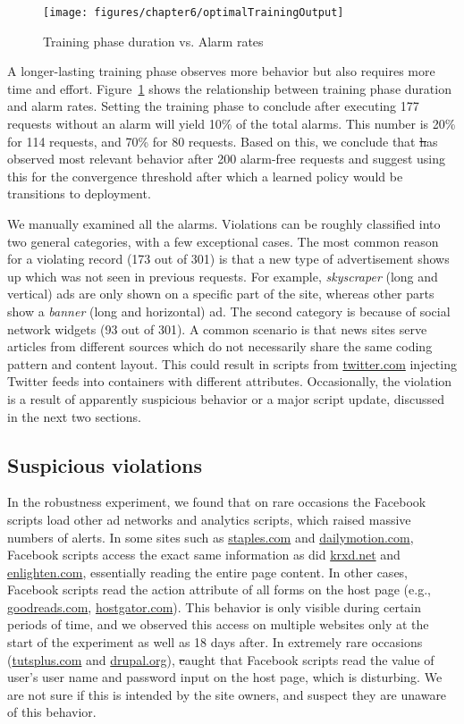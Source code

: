 \begin{figure}[b]
\centering
\captionsetup{justification=centering}
\texttt{[image: figures/chapter6/optimalTrainingOutput]}
\caption{Training phase duration vs. Alarm rates}
\label{fig:optimalTrainingOutput}
\end{figure}

 A longer-lasting training phase
observes more behavior but also requires more time and effort.
Figure~\ref{fig:optimalTrainingOutput} shows the relationship between
training phase duration and alarm rates.  Setting the training phase to
conclude after executing 177 requests without an alarm will yield 10\%
of the total alarms.  This number is 20\% for 114 requests, and 70\% for
80 requests.  Based on this, we conclude that \st has observed most
relevant behavior after 200 alarm-free requests and suggest using this
for the convergence threshold after which a learned policy would be
transitions to deployment.

We manually examined all the alarms.  Violations can be roughly
classified into two general categories, with a few exceptional cases.
The most common reason for a violating record (173 out of 301) is that a
new type of advertisement shows up which was not seen in previous
requests.  For example, \emph{skyscraper} (long and vertical) ads are
only shown on a specific part of the site, whereas other parts show a
\emph{banner} (long and horizontal) ad.  The second category is because
of social network widgets (93 out of 301).  A common scenario is that
news sites serve articles from different sources which do not
necessarily share the same coding pattern and content layout.  This
could result in scripts from \url{twitter.com} injecting Twitter feeds
into containers with different attributes.  Occasionally, the violation
is a result of apparently suspicious behavior or a major script update,
discussed in the next two sections.

\subsection{Suspicious violations}\label{sec:alerting}
In the robustness experiment, we found that on rare occasions the
Facebook scripts load other ad networks and analytics scripts, which
raised massive numbers of alerts.  In some sites such as
\url{staples.com} and \url{dailymotion.com}, Facebook scripts access the
exact same information as did \url{krxd.net} and \url{enlighten.com},
essentially reading the entire page content.  In other cases, Facebook
scripts read the action attribute of all forms on the host page (e.g.,
\url{goodreads.com}, \url{hostgator.com}).  This behavior is only
visible during certain periods of time, and we observed this access on
multiple websites only at the start of the experiment as well as 18 days
after.  In extremely rare occasions (\url{tutsplus.com} and
\url{drupal.org}), \st caught that Facebook scripts read the value of
user's user name and password input on the host page, which is
disturbing.  We are not sure if this is intended by the site owners, and
suspect they are unaware of this behavior.

